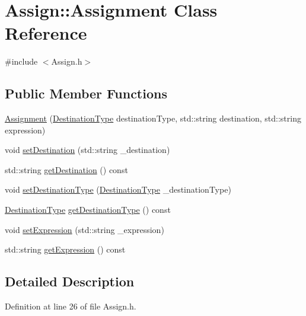 \hypertarget{class_assign_1_1_assignment}{\section{Assign\-:\-:Assignment Class Reference}
\label{class_assign_1_1_assignment}
}


{\ttfamily \#include $<$Assign.\-h$>$}

\subsection*{Public Member Functions}
\begin{DoxyCompactItemize}
\item 
\hyperlink{class_assign_1_1_assignment_a41583f4bbce99b1d95f4ef067c236f7a}{Assignment} (\hyperlink{class_assign_ae0f42117c12a8d0bc2bf0b7574070694}{Destination\-Type} destination\-Type, std\-::string destination, std\-::string expression)
\item 
void \hyperlink{class_assign_1_1_assignment_a8d0c9b18c0b1258bba905b4e47a2659b}{set\-Destination} (std\-::string \-\_\-destination)
\item 
std\-::string \hyperlink{class_assign_1_1_assignment_a6cf7ecd2950dfc709985a1ede3773be8}{get\-Destination} () const 
\item 
void \hyperlink{class_assign_1_1_assignment_a9688ea3171c85ccbcdf0ed9d87ad9cc7}{set\-Destination\-Type} (\hyperlink{class_assign_ae0f42117c12a8d0bc2bf0b7574070694}{Destination\-Type} \-\_\-destination\-Type)
\item 
\hyperlink{class_assign_ae0f42117c12a8d0bc2bf0b7574070694}{Destination\-Type} \hyperlink{class_assign_1_1_assignment_a46493b98c1cd97ce4b015640bf34dd27}{get\-Destination\-Type} () const 
\item 
void \hyperlink{class_assign_1_1_assignment_aa36ca609362d3deedffbefd9cceb12e6}{set\-Expression} (std\-::string \-\_\-expression)
\item 
std\-::string \hyperlink{class_assign_1_1_assignment_a724dc03a686c4d53d57ee45b7617ae2f}{get\-Expression} () const 
\end{DoxyCompactItemize}


\subsection{Detailed Description}


Definition at line 26 of file Assign.\-h.



